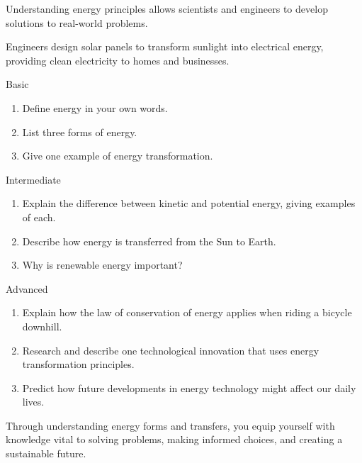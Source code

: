 Understanding energy principles allows scientists and engineers to develop solutions to real-world problems.

\begin{example}
Engineers design solar panels to transform sunlight into electrical energy, providing clean electricity to homes and businesses.
\end{example}

\begin{tieredquestions}{Basic}
\begin{enumerate}
\item Define energy in your own words.
\item List three forms of energy.
\item Give one example of energy transformation.
\end{enumerate}
\end{tieredquestions}

\begin{tieredquestions}{Intermediate}
\begin{enumerate}
\item Explain the difference between kinetic and potential energy, giving examples of each.
\item Describe how energy is transferred from the Sun to Earth.
\item Why is renewable energy important?
\end{enumerate}
\end{tieredquestions}

\begin{tieredquestions}{Advanced}
\begin{enumerate}
\item Explain how the law of conservation of energy applies when riding a bicycle downhill.
\item Research and describe one technological innovation that uses energy transformation principles.
\item Predict how future developments in energy technology might affect our daily lives.
\end{enumerate}
\end{tieredquestions}

Through understanding energy forms and transfers, you equip yourself with knowledge vital to solving problems, making informed choices, and creating a sustainable future.